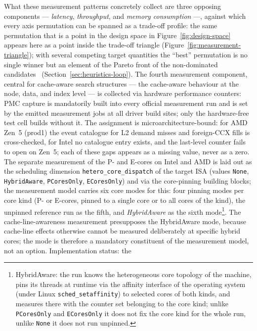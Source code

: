\begin{nurlang}
What these measurement patterns concretely collect are three opposing components --- \emph{latency},
\emph{throughput}, and \emph{memory consumption} ---, against which every axis permutation can be spanned as a
trade-off profile: the same permutation that is a point in the design space in Figure~\ref{fig:design-space}
appears here as a point inside the trade-off triangle
(Figure~\ref{fig:measurement-triangle}); with several competing target quantities the
\enquote{best} permutation is no single winner but an element of the Pareto front of the
non-dominated candidates~\cite{ehrgott2005multicriteria} (Section~\ref{sec:heuristics-loop}). The
fourth measurement component, central for cache-aware search structures --- the cache-aware behaviour at the
node, data, and index level --- is collected via hardware performance counters: PMC capture is
mandatorily built into every official measurement run and is set by the emitted measurement jobs at all
driver build sites; only the hardware-free test cell builds without it. The assignment is
microarchitecture-bound: for AMD Zen~5 (prod1) the event catalogue for L2 demand misses and
foreign-CCX fills is cross-checked, for Intel no catalogue entry exists, and the
last-level counter fails to open on Zen~5; each of these gaps appears as a missing value, never
as a zero.
The separate measurement of the P- and E-cores on Intel and AMD is laid out as the scheduling dimension
\texttt{hetero\_core\_dispatch} of the target ISA (values \texttt{None}, \texttt{HybridAware},
\texttt{PCoresOnly}, \texttt{ECoresOnly}) and via the core-pinning building blocks; the measurement model
carries six core modes for this: four pinning modes per core kind (P- or E-cores, pinned to a
single core or to all cores of the kind), the unpinned reference run as the fifth, and
\emph{HybridAware} as the sixth mode\footnote{HybridAware: the run knows the heterogeneous
core topology of the machine, pins its threads at runtime via the affinity interface of the
operating system (under Linux \texttt{sched\_setaffinity}) to selected cores of both kinds, and
measures there with the counter set belonging to the core kind; unlike \texttt{PCoresOnly} and
\texttt{ECoresOnly} it does not fix the core kind for the whole run, unlike \texttt{None}
it does not run unpinned.}. The cache-line-awareness measurement presupposes the HybridAware mode, because
cache-line effects otherwise cannot be measured deliberately at specific hybrid cores; the mode
is therefore a mandatory constituent of the measurement model, not an option. Implementation status: the

\end{nurlang}
